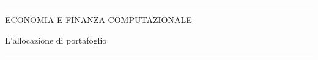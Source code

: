 \documentclass[12pt,aspectratio=169]{beamer}
\begin{document}
\begin{frame}
\unitlength 5mm

\begin{center}

\rule{\textwidth}{2pt}

\vskip3mm
ECONOMIA E FINANZA COMPUTAZIONALE

L'allocazione di portafoglio
\rule{\textwidth}{2pt}

\end{center}

\end{frame}


\end{document}
